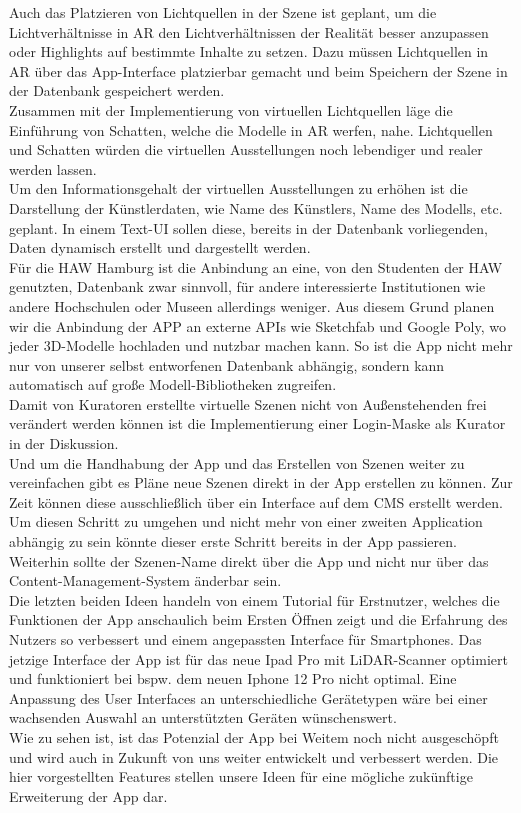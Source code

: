\documentclass[titlepage, a4paper, 11pt]{scrartcl}
\begin{document}
        Auch das Platzieren von Lichtquellen in der Szene ist geplant, um die Lichtverhältnisse in AR den Lichtverhältnissen der Realität besser anzupassen oder Highlights auf bestimmte Inhalte zu setzen. 
        Dazu müssen Lichtquellen in AR über das App-Interface platzierbar gemacht und beim Speichern der Szene in der Datenbank gespeichert werden.\\
        Zusammen mit der Implementierung von virtuellen Lichtquellen läge die Einführung von Schatten, welche die Modelle in AR werfen, nahe. 
        Lichtquellen und Schatten würden die virtuellen Ausstellungen noch lebendiger und realer werden lassen.\\
        Um den Informationsgehalt der virtuellen Ausstellungen zu erhöhen ist die Darstellung der Künstlerdaten, wie Name des Künstlers, Name des Modells, etc. geplant. 
        In einem Text-UI sollen diese, bereits in der Datenbank vorliegenden, Daten dynamisch erstellt und dargestellt werden.\\
        Für die HAW Hamburg ist die Anbindung an eine, von den Studenten der HAW genutzten, Datenbank zwar sinnvoll, für andere interessierte Institutionen wie andere Hochschulen oder Museen allerdings weniger. 
        Aus diesem Grund planen wir die Anbindung der APP an externe APIs wie Sketchfab und Google Poly, wo jeder 3D-Modelle hochladen und nutzbar machen kann. So ist die App nicht mehr nur von unserer selbst entworfenen Datenbank abhängig, sondern kann automatisch auf große Modell-Bibliotheken zugreifen.\\
        Damit von Kuratoren erstellte virtuelle Szenen nicht von Außenstehenden frei verändert werden können ist die Implementierung einer Login-Maske als Kurator in der Diskussion.\\
        Und um die Handhabung der App und das Erstellen von Szenen weiter zu vereinfachen gibt es Pläne neue Szenen direkt in der App erstellen zu können. Zur Zeit können diese ausschließlich über ein Interface auf dem CMS erstellt werden. 
        Um diesen Schritt zu umgehen und nicht mehr von einer zweiten Application abhängig zu sein könnte dieser erste Schritt bereits in der App passieren. Weiterhin sollte der Szenen-Name direkt über die App und nicht nur über das Content-Management-System änderbar sein.\\
        Die letzten beiden Ideen handeln von einem Tutorial für Erstnutzer, welches die Funktionen der App anschaulich beim Ersten Öffnen zeigt und die Erfahrung des Nutzers so verbessert und einem angepassten Interface für Smartphones. 
        Das jetzige Interface der App ist für das neue Ipad Pro mit LiDAR-Scanner optimiert und funktioniert bei bspw. dem neuen Iphone 12 Pro nicht optimal. Eine Anpassung des User Interfaces an unterschiedliche Gerätetypen wäre bei einer wachsenden Auswahl an unterstützten Geräten wünschenswert.\\

        Wie zu sehen ist, ist das Potenzial der App bei Weitem noch nicht ausgeschöpft und wird auch in Zukunft von uns weiter entwickelt und verbessert werden. 
        Die hier vorgestellten Features stellen unsere Ideen für eine mögliche zukünftige Erweiterung der App dar.

          
  
\end{document}
